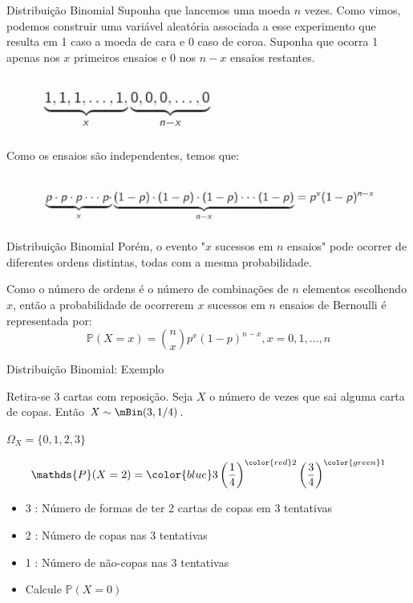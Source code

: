\begin{frame}{Distribuição Binomial}
    Suponha que lancemos uma moeda $n$ vezes. Como vimos, podemos construir uma variável aleatória associada a esse experimento que resulta em 1 caso a moeda de cara e 0 caso de coroa. 
    Suponha que ocorra 1 apenas nos $x$ primeiros ensaios e 0 nos $n-x$ ensaios restantes. 
    \begin{figure}
        \centering
        \includegraphics[width=0.3\linewidth]{figures/binom_1.png}
    \end{figure}

    Como os ensaios são independentes, temos que:

    \begin{figure}
        \centering
        \includegraphics[width=0.5\linewidth]{figures/binom_2.png}
    \end{figure}
\end{frame}

\begin{frame}{Distribuição Binomial}
    Porém, o evento "$x$ sucessos em $n$ ensaios" pode ocorrer de diferentes ordens distintas, todas com a mesma probabilidade. 

    Como o número de ordens é o número de combinações de $n$ elementos escolhendo $x$, então a probabilidade de ocorrerem $x$ sucessos em $n$ ensaios de Bernoulli é representada por:
    $$\mathds{P}(X=x) = \binom{n}{x}p^x(1-p)^{n-x}, x = 0,1, \dots, n$$
\end{frame}

\begin{frame}{Distribuição Binomial: Exemplo}

Retira-se 3 cartas com reposição. Seja $X$ o número de vezes que sai alguma carta de copas. Ent\~ao $X\sim\mBin(3,1/4)$. 
\medskip

$\Omega_X = \{0, 1, 2, 3\}$\\
\medskip


$$\mathds{P}(X=2)={\color{blue}3}\left(\frac{1}{4}\right)^{{\color{red}2}}\left(\frac{3}{4}\right)^{\color{green}1}$$

\begin{itemize}
\item {\color{blue}3} : Número de formas de ter 2 cartas de copas em 3 tentativas\\
\item {\color{red}2} : Número de copas nas 3 tentativas\\
\item {\color{green}1} : Número de não-copas nas 3 tentativas\\
\end{itemize}
\begin{itemize}
    \item Calcule $\mathds{P}(X=0)$
\end{itemize}
\end{frame}


